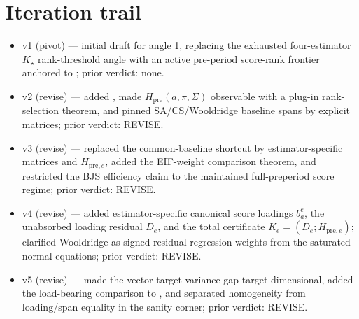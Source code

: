 \documentclass[11pt]{article}
\theoremstyle{definition}
\theoremstyle{plain}
\theoremstyle{remark}
\begin{document}
\section{Iteration trail}
\begin{itemize}[leftmargin=*]
\item v1 (pivot) --- initial draft for angle 1, replacing the exhausted
four-estimator \(K_\star\) rank-threshold angle with an active pre-period
score-rank frontier anchored to \citet{ChenSantAnnaXie2025}; prior verdict:
none.
\item v2 (revise) --- added \citet{RothSantAnna2023Efficient}, made
\(H_{\mathrm{pre}}(a,\pi,\Sigma)\) observable with a plug-in rank-selection
theorem, and pinned SA/CS/Wooldridge baseline spans by explicit matrices;
prior verdict: REVISE.
\item v3 (revise) --- replaced the common-baseline shortcut by
estimator-specific matrices and \(H_{\mathrm{pre},e}\), added the
\citet{ChenSantAnnaXie2025} EIF-weight comparison theorem, and restricted the
BJS efficiency claim to the maintained full-preperiod score regime; prior
verdict: REVISE.
\item v4 (revise) --- added estimator-specific canonical score loadings
\(b_a^e\), the unabsorbed loading residual \(D_e\), and the total certificate
\(K_e=(D_e;H_{\mathrm{pre},e})\); clarified Wooldridge as signed
residual-regression weights from the saturated normal equations; prior
verdict: REVISE.
\item v5 (revise) --- made the vector-target variance gap target-dimensional,
added the load-bearing comparison to \citet{EgamiYamauchi2023}, and separated
homogeneity from loading/span equality in the sanity corner; prior verdict:
REVISE.
\end{itemize}
\end{document}
